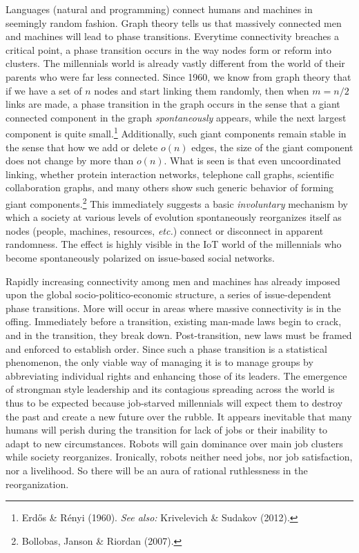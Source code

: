 \begin{multicols}{2}
Languages (natural and programming) connect humans and machines in seemingly random fashion. Graph theory tells us that massively connected men and machines will lead to phase transitions. Everytime connectivity breaches a critical point, a phase transition occurs in the way nodes form or reform into clusters. The millennials world is already vastly different from the world of their parents who were far less connected. Since 1960, we know from graph theory that if we have a set of $n$ nodes and start linking them randomly, then when $m = n/2$ links are made, a phase transition in the graph occurs in the sense that a giant connected component in the graph \textit{spontaneously} appears, while the next largest component is quite small.\footnote{Erdős \& Rényi (1960). \textit{See also:} Krivelevich \& Sudakov (2012).} Additionally, such giant components remain stable in the sense that how we add or delete $o(n)$ edges, the size of the giant component does not change by more than $o(n)$. What is seen is that even uncoordinated linking, whether protein interaction networks, telephone call graphs, scientific collaboration graphs, and many others show such generic behavior of forming giant components.\footnote{Bollobas, Janson \& Riordan (2007).} This immediately suggests a basic \textit{involuntary} mechanism by which a society at various levels of evolution spontaneously reorganizes itself as nodes (people, machines, resources, \textit{etc.}) connect or disconnect in apparent randomness. The effect is highly visible in the IoT world of the millennials who become spontaneously polarized on issue-based social networks.

Rapidly increasing connectivity among men and machines has already imposed upon the global socio-politico-economic structure, a series of issue-dependent phase transitions. More will occur in areas where massive connectivity is in the offing. Immediately before a transition, existing man-made laws begin to crack, and in the transition, they break down. Post-transition, new laws must be framed and enforced to establish order. Since such a phase transition is a statistical phenomenon, the only viable way of managing it is to manage groups by abbreviating individual rights and enhancing those of its leaders. The emergence of strongman style leadership and its contagious spreading across the world is thus to be expected because job-starved millennials will expect them to destroy the past and create a new future over the rubble. It appears inevitable that many humans will perish during the transition for lack of jobs or their inability to adapt to new circumstances. Robots will gain dominance over main job clusters while society reorganizes. Ironically, robots neither need jobs, nor job satisfaction, nor a livelihood. So there will be an aura of rational ruthlessness in the reorganization.


\end{multicols}
